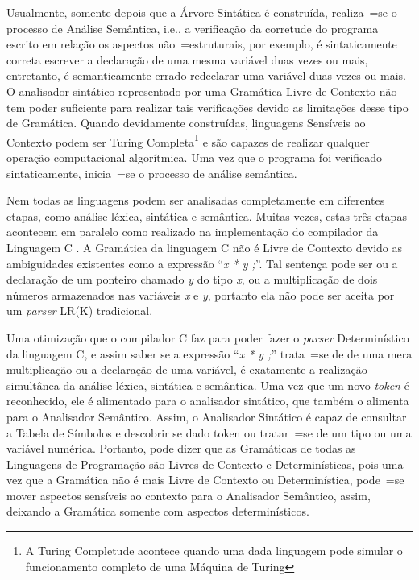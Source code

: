 {    Usualmente,
    somente depois que a Árvore Sintática é construída,
    realiza~=se o processo de Análise Semântica,
    i.e.,
    a verificação da corretude do programa escrito em relação os aspectos não~=estruturais,
    por exemplo,
    é sintaticamente correta escrever a declaração de uma mesma variável duas vezes ou mais,
    entretanto,
    é semanticamente errado redeclarar uma variável duas vezes ou mais.
    O analisador sintático representado por uma Gramática Livre de Contexto não tem poder
    suficiente para realizar tais verificações devido as limitações desse tipo de Gramática.
    Quando devidamente construídas,
    linguagens Sensíveis ao Contexto podem ser Turing Completa\footnote{A Turing Completude
    acontece quando uma dada linguagem pode simular o funcionamento completo de uma Máquina
    de Turing} \cite{areThereDomainSpecificLanguages,contextSensitiveParsing} e
    são capazes de realizar qualquer operação computacional algorítmica.
    Uma vez que o programa foi verificado sintaticamente,
    inicia~=se o processo de análise semântica.

    Nem todas as linguagens podem ser analisadas completamente em diferentes etapas,
    como análise léxica, sintática e semântica. Muitas vezes,
    estas três etapas acontecem em paralelo como realizado na implementação do
    compilador da Linguagem C \cite{jourdan2017,whyCcannotBeParsedWithALR1Parser}.
    A Gramática da linguagem C não é Livre de Contexto devido as
    ambiguidades existentes como a expressão ``\textit{x * y ;}''.
    Tal sentença pode ser ou a declaração de um ponteiro chamado \textit{y} do tipo \textit{x},
    ou a multiplicação de dois números armazenados nas variáveis \textit{x} e
    \textit{y},
    portanto ela não pode ser aceita por um \textit{parser} LR(K) tradicional.

    Uma otimização que o compilador C faz para poder fazer o \textit{parser} Determinístico da linguagem C,
    e assim saber se a expressão ``\textit{x * y ;}'' trata~=se de
    de uma mera multiplicação ou a declaração de uma variável,
    é exatamente a realização simultânea da análise léxica,
    sintática e
    semântica.
    Uma vez que um novo \textit{token} é reconhecido,
    ele é alimentado para o analisador sintático,
    que também o alimenta para o Analisador Semântico.
    Assim,
    o Analisador Sintático é capaz de consultar a Tabela de Símbolos e
    descobrir se dado token ou tratar~=se de um tipo ou uma variável numérica.
    Portanto,
    pode dizer que as Gramáticas de todas as Linguagens de Programação são Livres de Contexto e
    Determinísticas,
    pois uma vez que a Gramática não é mais Livre de Contexto ou Determinística,
    pode~=se mover aspectos sensíveis ao contexto para o Analisador Semântico,
    assim,
    deixando a Gramática somente com aspectos determinísticos.
}

